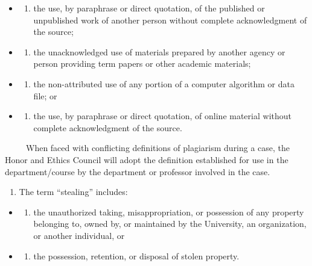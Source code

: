 \begin{itemize}
\item
  \begin{enumerate}
  \def\labelenumi{(\alph{enumi})}
  \tightlist
  \item
    the use, by paraphrase or direct quotation, of the published or unpublished work of another person without complete acknowledgment of the source;
  \end{enumerate}
\item
  \begin{enumerate}
  \def\labelenumi{(\alph{enumi})}
  \setcounter{enumi}{1}
  \tightlist
  \item
    the unacknowledged use of materials prepared by another agency or person providing term papers or other academic materials;
  \end{enumerate}
\item
  \begin{enumerate}
  \def\labelenumi{(\alph{enumi})}
  \setcounter{enumi}{2}
  \tightlist
  \item
    the non-attributed use of any portion of a computer algorithm or data file; or
  \end{enumerate}
\item
  \begin{enumerate}
  \def\labelenumi{(\alph{enumi})}
  \setcounter{enumi}{3}
  \tightlist
  \item
    the use, by paraphrase or direct quotation, of online material without complete acknowledgment of the source.
  \end{enumerate}
\end{itemize}

~~~~~When faced with conflicting definitions of plagiarism during a case, the Honor and Ethics Council will adopt the definition established for use in the department/course by the department or professor involved in the case.

\begin{enumerate}
\def\labelenumi{\arabic{enumi}.}
\setcounter{enumi}{2}
\tightlist
\item
  The term ``stealing'' includes:
\end{enumerate}

\begin{itemize}
\item
  \begin{enumerate}
  \def\labelenumi{(\alph{enumi})}
  \tightlist
  \item
    the unauthorized taking, misappropriation, or possession of any property belonging to, owned by, or maintained by the University, an organization, or another individual, or
  \end{enumerate}
\item
  \begin{enumerate}
  \def\labelenumi{(\alph{enumi})}
  \setcounter{enumi}{1}
  \tightlist
  \item
    the possession, retention, or disposal of stolen property.
  \end{enumerate}
\end{itemize}

